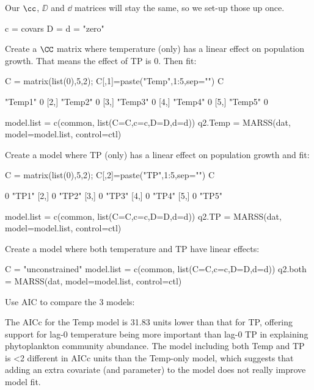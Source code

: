 Our $\cc$, $\DD$ and $\dd$ matrices will stay the same, so we set-up those up once.
\begin{Schunk}
\begin{Sinput}
 c = covars
 D = d = "zero"
\end{Sinput}
\end{Schunk}
Create a $\CC$ matrix where temperature (only) has a linear effect on population growth.  That means the effect of TP is 0.  Then fit:
\begin{Schunk}
\begin{Sinput}
 C = matrix(list(0),5,2); C[,1]=paste("Temp",1:5,sep="")
 C
\end{Sinput}
\begin{Soutput}
     [,1]    [,2]
[1,] "Temp1" 0   
[2,] "Temp2" 0   
[3,] "Temp3" 0   
[4,] "Temp4" 0   
[5,] "Temp5" 0   
\end{Soutput}
\end{Schunk}
\begin{Schunk}
\begin{Sinput}
 model.list = c(common, list(C=C,c=c,D=D,d=d))
 q2.Temp = MARSS(dat, model=model.list, control=ctl)
\end{Sinput}
\end{Schunk}
Create a model where TP (only) has a linear effect on population growth and fit:
\begin{Schunk}
\begin{Sinput}
 C = matrix(list(0),5,2); C[,2]=paste("TP",1:5,sep="")
 C
\end{Sinput}
\begin{Soutput}
     [,1] [,2] 
[1,] 0    "TP1"
[2,] 0    "TP2"
[3,] 0    "TP3"
[4,] 0    "TP4"
[5,] 0    "TP5"
\end{Soutput}
\end{Schunk}
\begin{Schunk}
\begin{Sinput}
 model.list = c(common, list(C=C,c=c,D=D,d=d))
 q2.TP = MARSS(dat, model=model.list, control=ctl)
\end{Sinput}
\end{Schunk}
Create a model where both temperature and TP have linear effects:
\begin{Schunk}
\begin{Sinput}
 C = "unconstrained"
 model.list = c(common, list(C=C,c=c,D=D,d=d))
 q2.both = MARSS(dat, model=model.list, control=ctl)
\end{Sinput}
\end{Schunk}
Use AIC to compare the 3 models:
\begin{Schunk}
\end{Schunk}
The AICc for the Temp model is 31.83 units lower than that for TP, offering
support for lag-0 temperature being more important than lag-0 TP in explaining
phytoplankton community abundance. The model including both Temp and TP
is <2 different in AICc units than the Temp-only model, which suggests
that adding an extra covariate (and parameter) to the model does not really
improve model fit.


